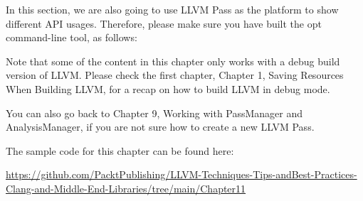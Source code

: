 In this section, we are also going to use LLVM Pass as the platform to show different API usages. Therefore, please make sure you have built the opt command-line tool, as follows:


Note that some of the content in this chapter only works with a debug build version of LLVM. Please check the first chapter, Chapter 1, Saving Resources When Building LLVM, for a recap on how to build LLVM in debug mode.

You can also go back to Chapter 9, Working with PassManager and AnalysisManager, if you are not sure how to create a new LLVM Pass.

The sample code for this chapter can be found here:

\url{https://github.com/PacktPublishing/LLVM-Techniques-Tips-andBest-Practices-Clang-and-Middle-End-Libraries/tree/main/Chapter11}





























